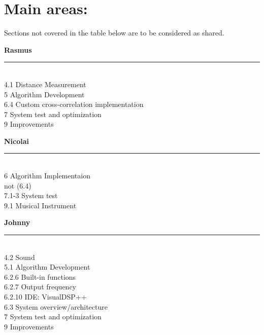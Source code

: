 \section{Main areas:}
Sections not covered in the table below are to be considered as shared.\\
\begin{minipage}{0.31\columnwidth}
\begin{center}
\textbf{Rasmus}
\end{center}
\hrule
\ \\
4.1 Distance Measurement\\
5 Algorithm Development\\
6.4 Custom cross-correlation implementation\\
7 System test and optimization\\
9 Improvements\\
\end{minipage}
\hfill
\vline
\hfill
\begin{minipage}{0.31\columnwidth}
\begin{center}
\textbf{Nicolai}
\end{center}
\hrule
\ \\
6 Algorithm Implementaion\\
 not (6.4)\\
7.1-3 System test\\
9.1 Musical Instrument\\
\end{minipage}
\hfill
\vline
\hfill
\begin{minipage}{0.31\columnwidth}
\begin{center}
\textbf{Johnny}
\end{center}
\hrule
\ \\
4.2 Sound\\
5.1 Algorithm Development\\
6.2.6 Built-in functions\\
6.2.7 Output frequency\\
6.2.10 IDE: VisualDSP++\\
6.3 System overview/architecture\\
7 System test and optimization\\
9 Improvements\\
\end{minipage}